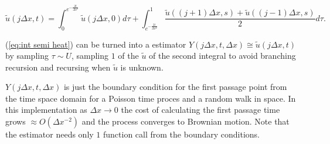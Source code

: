 \documentclass[a4paper,12pt]{article}
\begin{document}




\begin{equation}
  \tilde{u}(j \Delta x,t) = \int_{0}^{e^{-\frac{2t}{\Delta x^{2}}}}  \tilde{u}(j \Delta x,0) d\tau+
  \int_{e^{-\frac{2t}{\Delta x^{2}}}}^{1} \frac{\tilde{u}((j+1) \Delta x,s)+\tilde{u}((j-1) \Delta x,s)}{2}d\tau. \label{eq:int semi heat}
\end{equation}



\begin{julia}\label{jl:point estimator heat}

  (\ref{eq:int semi heat}) can be turned into a estimator $Y(j \Delta x,t,\Delta x ) \cong  \tilde{u}(j \Delta x,t)$
  by sampling $\tau \sim U$,
  sampling $1$ of the $\tilde{u}$ of the second integral to avoid branching recursion and
  recursing when $\tilde{u}$ is unknown.


  $Y(j \Delta x,t,\Delta x )$ is just the boundary condition
  for the first passage point from the time space domain for a Poisson time proces and a random walk in space.
  In this implementation as  $\Delta x \rightarrow 0$  the cost of calculating the first passage time grows
  $\approx O(\Delta x ^{-2})$ and the process converges to Brownian motion. Note that the estimator needs
  only $1$ function call from the boundary conditions.
\end{julia}
\end{document}
